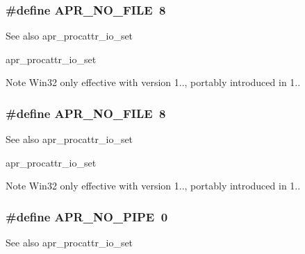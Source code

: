 \subsubsection[{\texorpdfstring{A\+P\+R\+\_\+\+N\+O\+\_\+\+F\+I\+LE}{APR_NO_FILE}}]{\setlength{\rightskip}{0pt plus 5cm}\#define A\+P\+R\+\_\+\+N\+O\+\_\+\+F\+I\+LE~8}\hypertarget{group__apr__thread__proc_ga597fb6a501c20cc3a597fe6c613f4310}{}\label{group__apr__thread__proc_ga597fb6a501c20cc3a597fe6c613f4310}
\begin{DoxySeeAlso}{See also}
apr\+\_\+procattr\+\_\+io\+\_\+set

apr\+\_\+procattr\+\_\+io\+\_\+set 
\end{DoxySeeAlso}
\begin{DoxyNote}{Note}
Win32 only effective with version 1.., portably introduced in 1.. 
\end{DoxyNote}
\subsubsection[{\texorpdfstring{A\+P\+R\+\_\+\+N\+O\+\_\+\+F\+I\+LE}{APR_NO_FILE}}]{\setlength{\rightskip}{0pt plus 5cm}\#define A\+P\+R\+\_\+\+N\+O\+\_\+\+F\+I\+LE~8}\hypertarget{group__apr__thread__proc_ga597fb6a501c20cc3a597fe6c613f4310}{}\label{group__apr__thread__proc_ga597fb6a501c20cc3a597fe6c613f4310}
\begin{DoxySeeAlso}{See also}
apr\+\_\+procattr\+\_\+io\+\_\+set

apr\+\_\+procattr\+\_\+io\+\_\+set 
\end{DoxySeeAlso}
\begin{DoxyNote}{Note}
Win32 only effective with version 1.., portably introduced in 1.. 
\end{DoxyNote}
\subsubsection[{\texorpdfstring{A\+P\+R\+\_\+\+N\+O\+\_\+\+P\+I\+PE}{APR_NO_PIPE}}]{\setlength{\rightskip}{0pt plus 5cm}\#define A\+P\+R\+\_\+\+N\+O\+\_\+\+P\+I\+PE~0}\hypertarget{group__apr__thread__proc_gab7cfcb8ed24e6c0a76cd41b5b113ae95}{}\label{group__apr__thread__proc_gab7cfcb8ed24e6c0a76cd41b5b113ae95}
\begin{DoxySeeAlso}{See also}
apr\+\_\+procattr\+\_\+io\+\_\+set 
\end{DoxySeeAlso}
